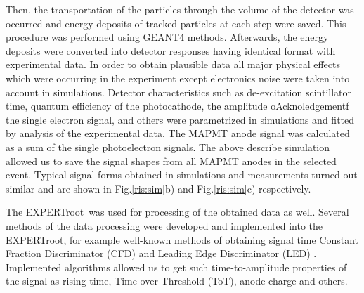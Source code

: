 \documentclass{webofc}
\newcommand{\er}{\textmd{EXPERTroot}}
\begin{document}
Then, the transportation of the particles through the volume of the detector was occurred and energy deposits of tracked particles at each step were saved.
This procedure was performed using GEANT4 \cite{geant4} methods. Afterwards, the energy deposits were converted into detector responses having identical format with experimental data.
In order to obtain plausible data all major physical effects which were occurring in the experiment except electronics noise were taken into account in simulations.
Detector characteristics such as de-excitation scintillator time, quantum efficiency of the photocathode, the amplitude oAcknoledgementf the single electron signal, and others were parametrized in simulations and fitted by analysis of the experimental data.
The MAPMT anode signal was calculated as a sum of the single photoelectron signals.
The above describe simulation allowed us to save the signal shapes  from all MAPMT anodes in the selected event.
Typical signal forms obtained in simulations and measurements turned out similar and are shown in Fig.\ref{ris:sim}b) and Fig.\ref{ris:sim}c) respectively.
	
The \er\, was used for processing of the obtained data as well.
Several methods of the data processing were developed and implemented into the \er, for example well-known methods of obtaining signal time Constant Fraction Discriminator (CFD) and Leading Edge Discriminator (LED) \cite{diplom}.
	Implemented algorithms allowed us to get such time-to-amplitude properties of the signal as rising time, Time-over-Threshold (ToT), anode charge and others. 
\end{document}
